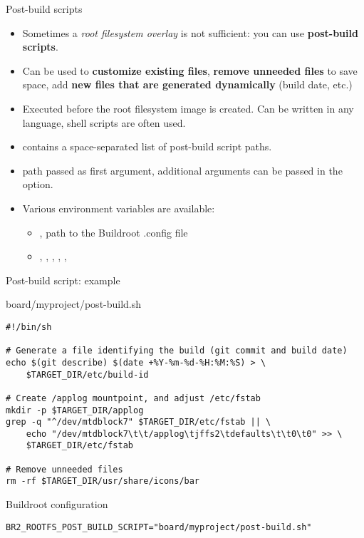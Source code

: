 \begin{frame}{Post-build scripts}
  \begin{itemize}
  \item Sometimes a {\em root filesystem overlay} is not sufficient:
    you can use {\bf post-build scripts}.
  \item Can be used to {\bf customize existing files}, {\bf remove
      unneeded files} to save space, add {\bf new files that are
      generated dynamically} (build date, etc.)
  \item Executed before the root filesystem image is created. Can be
    written in any language, shell scripts are often used.
  \item {} contains a space-separated
    list of post-build script paths.
  \item {} path passed as first argument, additional
    arguments can be passed in the 
    option.
  \item Various environment variables are available:
    \begin{itemize}
      \item {}, path to the Buildroot .config file
      \item {}, , ,
        , , 
      \end{itemize}
  \end{itemize}
\end{frame}

\begin{frame}[fragile]{Post-build script: example}

\begin{block}{board/myproject/post-build.sh}
\begin{verbatim}
#!/bin/sh

# Generate a file identifying the build (git commit and build date)
echo $(git describe) $(date +%Y-%m-%d-%H:%M:%S) > \
    $TARGET_DIR/etc/build-id

# Create /applog mountpoint, and adjust /etc/fstab
mkdir -p $TARGET_DIR/applog
grep -q "^/dev/mtdblock7" $TARGET_DIR/etc/fstab || \
    echo "/dev/mtdblock7\t\t/applog\tjffs2\tdefaults\t\t0\t0" >> \
    $TARGET_DIR/etc/fstab

# Remove unneeded files
rm -rf $TARGET_DIR/usr/share/icons/bar
\end{verbatim}
\end{block}

\begin{block}{Buildroot configuration}
{\scriptsize
\begin{verbatim}
BR2_ROOTFS_POST_BUILD_SCRIPT="board/myproject/post-build.sh"
\end{verbatim}}
\end{block}

\end{frame}


